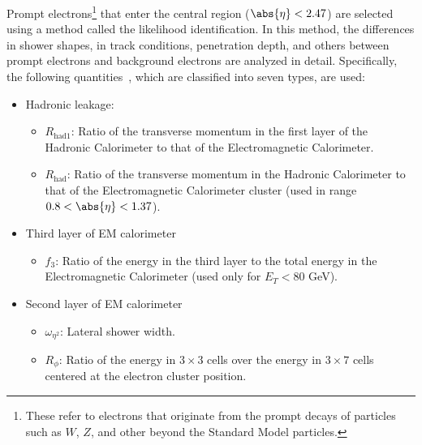 Prompt electrons\footnote{These refer to electrons that originate from the
	prompt decays of particles such as $W$, $Z$, and other beyond the Standard
	Model particles.} that enter the central region ($\abs{\eta} < 2.47$) are
selected using a method called the likelihood identification. In this method,
the differences in shower shapes, in track conditions, penetration depth, and
others between prompt electrons and background electrons are analyzed in
detail. Specifically, the following quantities~\cite{atlaselcid}, which are classified into seven
types, are used:

\begin{itemize}
	\item Hadronic leakage:
	      \begin{itemize}
		      \item $R_{\text{had1}}$: Ratio of the transverse momentum in the first layer
		            of the Hadronic Calorimeter to that of the Electromagnetic Calorimeter.

		      \item $R_{\text{had}}$: Ratio of the transverse momentum in the Hadronic Calorimeter
		            to that of the Electromagnetic Calorimeter cluster (used in range $0.8 < \abs{\eta} < 1.37$).

	      \end{itemize}

	\item Third layer of EM calorimeter
	      \begin{itemize}
		      \item $f_3$: Ratio of the energy in the third layer to the total energy in the Electromagnetic
		            Calorimeter (used only for $E_T < 80$ GeV).

	      \end{itemize}
	\item Second layer of EM calorimeter
	      \begin{itemize}
		      \item $\omega_{\eta^2}$: Lateral shower width.

		      \item $R_{\phi}$: Ratio of the energy in $3\times 3$ cells over the energy in $3\times 7$ cells
		            centered at the electron cluster position.


\end{itemize}
\end{itemize}
